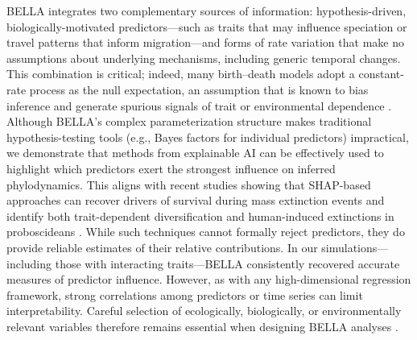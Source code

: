 BELLA integrates two complementary sources of information: hypothesis-driven, biologically-motivated predictors---such as traits that may influence speciation or travel patterns that inform migration---and forms of rate variation that make no assumptions about underlying mechanisms, including generic temporal changes. 
This combination is critical; indeed, many birth–death models adopt a constant-rate process as the null expectation, an assumption that is known to bias inference and generate spurious signals of trait or environmental dependence \citep{maddison2007estimating, lehtonen2017environmentally, beaulieu2016detecting, rabosky2015model, o2021potential}.
Although BELLA’s complex parameterization structure makes traditional hypothesis-testing tools (e.g., Bayes factors for individual predictors) impractical, we demonstrate that methods from explainable AI can be effectively used to highlight which predictors exert the strongest influence on inferred phylodynamics. 
This aligns with recent studies showing that SHAP-based approaches can recover drivers of survival during mass extinction events \citep{foster2023predictable} and identify both trait-dependent diversification and human-induced extinctions in proboscideans \citep{hauffe2024trait}. 
While such techniques cannot formally reject predictors, they do provide reliable estimates of their relative contributions. 
In our simulations---including those with interacting traits---BELLA consistently recovered accurate measures of predictor influence. 
However, as with any high-dimensional regression framework, strong correlations among predictors or time series can limit interpretability. 
Careful selection of ecologically, biologically, or environmentally relevant variables therefore remains essential when designing BELLA analyses \citep{o2021potential}.

